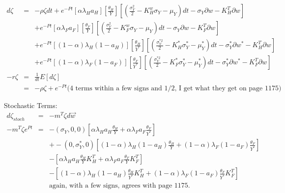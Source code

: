 \documentclass[]{article}
\begin{document}
\begin{eqnarray*}
d\zeta &=& -\rho \zeta dt + e^{-Pt} [\alpha \lambda_H a_H] \left[\frac{\theta_H}{Y}\right] \left[\left(\frac{\sigma_Y^2}{2}-K_H^w \sigma_Y -\mu_Y\right) dt - \sigma_Y \partial w - K_H^T \partial w\right]\\
&& + e^{-Pt} [\alpha \lambda_F a_F] \left[\frac{\theta_F}{Y}\right] \left[\left(\frac{\sigma_Y^2}{2}-K_F^w \sigma_Y -\mu_Y\right) dt - \sigma_Y \partial w - K_F^T \partial w\right]\\
&& + e^{-Pt} [(1-\alpha) \lambda_H (1-a_H)] \left[\frac{\theta_H}{Y^*}\right] \left[\left(\frac{\sigma_Y^{*2}}{2}-K_H^* \sigma_Y^* -\mu_Y^* \right) dt - \sigma_Y^* \partial w^* - K_H^T \partial w\right]\\
&& + e^{-Pt} [(1-\alpha) \lambda_F (1-a_F)] \left[\frac{\theta_F}{Y^*}\right] \left[\left(\frac{\sigma_Y^{*2}}{2}-K_F^* \sigma_Y^* -\mu_Y^* \right) dt - \sigma_Y^* \partial w^* - K_F^T \partial w\right]\\
-r\zeta &=& \frac{1}{dt} E[d\zeta]\\
&=& -\rho \zeta + e^{-Pt} \mbox{(4 terms within a few signs and 1/2, I get what they get on page 1175)}
\end{eqnarray*}

Stochastic Terms:
\begin{eqnarray*}
d\zeta_{stoch} &=& -m^T \zeta d\vec{w}\\
-m^T\zeta e^{Pt} &=& -(\sigma_Y,0,0) \left[\alpha \lambda_H a_H \frac{\theta_H}{Y} + \alpha \lambda_F a_F \frac{\theta_F}{Y^*}\right]\\
&& + -(0,\sigma_Y^*,0) \left[(1-\alpha) \lambda_H (1-a_H) \frac{\theta_H}{Y} + (1-\alpha) \lambda_F (1-a_F) \frac{\theta_F}{Y^*}\right]\\
&& - \left[\alpha \lambda_H a_H \frac{\theta_H}{Y} K_H^T + \alpha \lambda_F a_F \frac{\theta_F}{Y}K_F^T\right]\\
&& - \left[(1-\alpha) \lambda_H (1-a_H) \frac{\theta_H}{Y^*} K_H^T + (1-\alpha) \lambda_F (1-a_F) \frac{\theta_F}{Y^*}K_F^T\right]\\
&& \mbox{again, with a few signs, agrees with page 1175.}
\end{eqnarray*}
\end{document}
